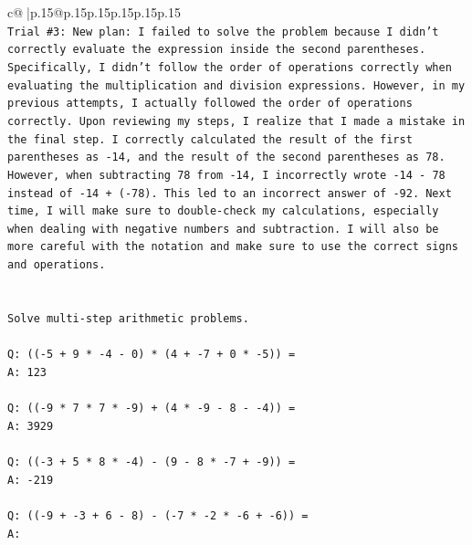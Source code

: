 \documentclass{article}
\begin{document}
{\begin{supertabular}{c@{$\;$}|p{.15\linewidth}@{}p{.15\linewidth}p{.15\linewidth}p{.15\linewidth}p{.15\linewidth}p{.15\linewidth}}
{{{\\ 
\texttt{Trial \#3: New plan: I failed to solve the problem because I didn't correctly evaluate the expression inside the second parentheses. Specifically, I didn't follow the order of operations correctly when evaluating the multiplication and division expressions. However, in my previous attempts, I actually followed the order of operations correctly. Upon reviewing my steps, I realize that I made a mistake in the final step. I correctly calculated the result of the first parentheses as {-}14, and the result of the second parentheses as 78. However, when subtracting 78 from {-}14, I incorrectly wrote {-}14 {-} 78 instead of {-}14 + ({-}78). This led to an incorrect answer of {-}92. Next time, I will make sure to double{-}check my calculations, especially when dealing with negative numbers and subtraction. I will also be more careful with the notation and make sure to use the correct signs and operations.} \\
\\ 
\\ 
\texttt{Solve multi{-}step arithmetic problems.} \\
\\ 
\texttt{Q: (({-}5 + 9 * {-}4 {-} 0) * (4 + {-}7 + 0 * {-}5)) =} \\
\texttt{A: 123} \\
\\ 
\texttt{Q: (({-}9 * 7 * 7 * {-}9) + (4 * {-}9 {-} 8 {-} {-}4)) =} \\
\texttt{A: 3929} \\
\\ 
\texttt{Q: (({-}3 + 5 * 8 * {-}4) {-} (9 {-} 8 * {-}7 + {-}9)) =} \\
\texttt{A: {-}219} \\
\\ 
\texttt{Q: (({-}9 + {-}3 + 6 {-} 8) {-} ({-}7 * {-}2 * {-}6 + {-}6)) =} \\
\texttt{A:} \\
            }
        }
    }
     \\ \\


\end{supertabular}}
\end{document}
